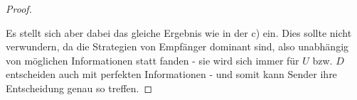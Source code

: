 \documentclass[12pt]{article}
\begin{document}
\begin{enumerate}[label=\alph*\upshape)]
\begin{proof}
\begin{figure}[h!]
\end{figure}

			Es stellt sich aber dabei das gleiche Ergebnis wie in der c) ein. Dies sollte nicht verwundern, da die Strategien von Empfänger dominant sind, also unabhängig von möglichen Informationen statt fanden - sie wird sich immer für $U$ bzw. $D$ entscheiden auch mit perfekten Informationen - und somit kann Sender ihre Entscheidung genau so treffen.
		\end{proof}
\end{enumerate}
\end{document}
